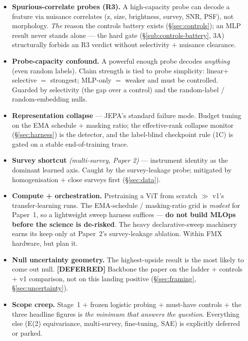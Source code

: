 \documentclass[11pt,a4paper]{article}
\newcommand{\dfr}{\textcolor{deferred}{\sffamily\bfseries[DEFERRED]}}
\begin{document}
\begin{itemize}[leftmargin=1.4em,itemsep=3pt]
\item \textbf{Spurious-correlate probes (R3).} A high-capacity probe can decode a feature via
nuisance correlates (z, size, brightness, survey, SNR, PSF), not morphology. \emph{The} reason
the controls battery exists (\S\ref{sec:controls}); an MLP result never stands alone --- the hard
gate (\S\ref{sub:controls-battery}, 3A) structurally forbids an R3 verdict without selectivity
$+$ nuisance clearance.
\item \textbf{Probe-capacity confound.} A powerful enough probe decodes \emph{anything} (even
random labels). Claim strength is tied to probe simplicity: linear$+$selective $=$ strongest;
MLP-only $=$ weaker and must be controlled. Guarded by selectivity (the gap over a control) and
the random-label / random-embedding nulls.
\item \textbf{Representation collapse} --- JEPA's standard failure mode. Budget tuning on the EMA
schedule $+$ masking ratio; the effective-rank collapse monitor (\S\ref{sec:harness}) is the
detector, and the label-blind checkpoint rule (1C) is gated on a stable end-of-training trace.
\item \textbf{Survey shortcut} \emph{(multi-survey, Paper 2)} --- instrument identity as the
dominant learned axis. Caught by the survey-leakage probe; mitigated by homogenisation $+$ close
surveys first (\S\ref{sec:data}).
\item \textbf{Compute + orchestration.} Pretraining a ViT from scratch $\gg$ v1's
transfer-learning runs. The EMA-schedule / masking-ratio grid is \emph{modest} for Paper~1, so a
lightweight sweep harness suffices --- \textbf{do not build MLOps before the science is
de-risked}. The heavy declarative-sweep machinery earns its keep only at Paper~2's survey-leakage
ablation. Within FMX hardware, but plan it.
\item \textbf{Null uncertainty geometry.} The highest-upside result is the most likely to come
out null. \dfr{} Backbone the paper on the ladder $+$ controls $+$ v1 comparison, not on this
landing positive (\S\ref{sec:framing}, \S\ref{sec:uncertainty}).
\item \textbf{Scope creep.} Stage~1 $+$ frozen logistic probing $+$ must-have controls $+$ the
three headline figures is \emph{the minimum that answers the question}. Everything else (E(2)
equivariance, multi-survey, fine-tuning, SAE) is explicitly deferred or parked.
\end{itemize}
\end{document}
